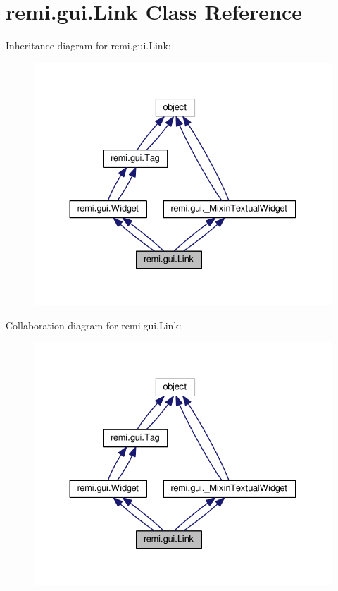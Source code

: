 \hypertarget{classremi_1_1gui_1_1Link}{}\section{remi.\+gui.\+Link Class Reference}
\label{classremi_1_1gui_1_1Link}


Inheritance diagram for remi.\+gui.\+Link\+:
\nopagebreak
\begin{figure}[H]
\begin{center}
\leavevmode
\includegraphics[width=330pt]{d4/d93/classremi_1_1gui_1_1Link__inherit__graph}
\end{center}
\end{figure}


Collaboration diagram for remi.\+gui.\+Link\+:
\nopagebreak
\begin{figure}[H]
\begin{center}
\leavevmode
\includegraphics[width=330pt]{db/d4e/classremi_1_1gui_1_1Link__coll__graph}
\end{center}
\end{figure}
